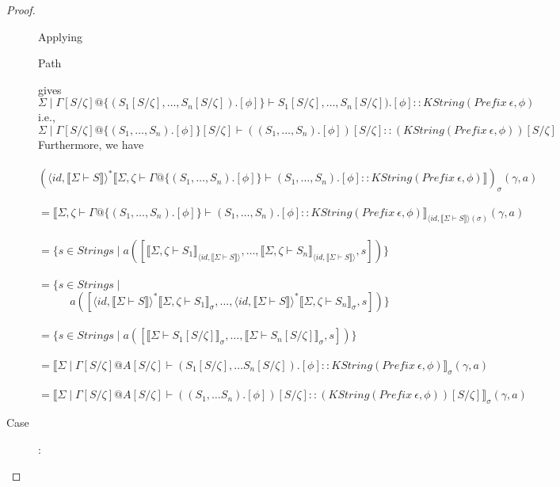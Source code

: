 \documentclass{article}
\newcommand{\sem}[1]{\llbracket #1 \rrbracket}
\begin{document}
\begin{proof}
\begin{description}
Applying \begin{sc}Path\end{sc} gives 
$$\Sigma \mid \Gamma[S/\zeta] @ \{ (S_1[S/\zeta],\ldots,S_n[S/\zeta]).[\phi] \} \vdash S_1[S/\zeta],\ldots,S_n[S/\zeta]).[\phi] :: \mathit{KString}(\mathit{Prefix}~\epsilon,\phi)$$
i.e.,
$$\Sigma \mid \Gamma[S/\zeta] @ \{ (S_1,\ldots,S_n).[\phi] \}[S/\zeta] \vdash ((S_1,\ldots,S_n).[\phi])[S/\zeta] :: (\mathit{KString}(\mathit{Prefix}~\epsilon,\phi))[S/\zeta]$$
Furthermore, we have\\~\\
$(\langle \mathit{id}, \sem{\Sigma \vdash S} \rangle^* \sem{\Sigma,\zeta \vdash \Gamma @ \{ (S_1, \ldots, S_n).[\phi] \} \vdash (S_1, \ldots, S_n).[\phi] :: \mathit{KString(\mathit{Prefix}~\epsilon,\phi)} })_{\sigma}(\gamma,a)$\\~\\
$= \sem{\Sigma,\zeta \vdash \Gamma @ \{ (S_1, \ldots, S_n).[\phi] \} \vdash (S_1, \ldots, S_n).[\phi] :: \mathit{KString(\mathit{Prefix}~\epsilon,\phi)}}_{\langle \mathit{id}, \sem{\Sigma \vdash S} \rangle(\sigma)}(\gamma,a)$\\~\\
$= \{ s \in \mathit{Strings} \mid a([\sem{\Sigma,\zeta \vdash S_1}_{\langle \mathit{id}, \sem{\Sigma \vdash S} \rangle}, \ldots, \sem{\Sigma,\zeta \vdash S_n}_{\langle \mathit{id}, \sem{\Sigma \vdash S} \rangle}, s])\}$\\~\\
$= \{ s \in \mathit{Strings} \mid$ \\
$~~~~~~~~~~~~~a([\langle \mathit{id}, \sem{\Sigma \vdash S} \rangle^*\sem{\Sigma,\zeta \vdash S_1}_\sigma, \ldots, \langle \mathit{id}, \sem{\Sigma \vdash S} \rangle^*\sem{\Sigma,\zeta \vdash S_n}_\sigma, s])\}$\\~\\
$= \{ s \in \mathit{Strings} \mid a([\sem{\Sigma \vdash S_1[S/\zeta]}_\sigma, \ldots, \sem{\Sigma \vdash S_n[S/\zeta]}_\sigma, s])\}$\\~\\
$= \sem{\Sigma \mid \Gamma[S/\zeta] @ A[S/\zeta] \vdash (S_1[S/\zeta], \ldots S_n[S/\zeta]).[\phi] :: \mathit{KString}(\mathit{Prefix}~\epsilon,\phi)}_{\sigma}(\gamma, a)$\\~\\
$= \sem{\Sigma \mid \Gamma[S/\zeta] @ A[S/\zeta] \vdash ((S_1, \ldots S_n).[\phi])[S/\zeta] :: (\mathit{KString}(\mathit{Prefix}~\epsilon,\phi))[S/\zeta]}_\sigma(\gamma,a)$


\item[Case \begin{sc}StrAbs\end{sc}]:~\\


\end{description}
\end{proof}
\end{document}

